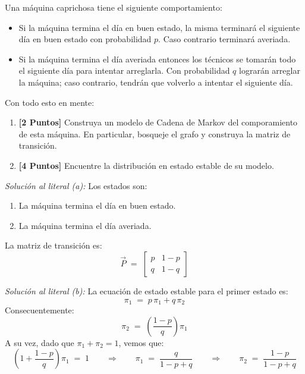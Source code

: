 \documentclass[ a4paper, twoside, 11pt]{article}
\begin{document}
\begin{problem}
Una m\'aquina caprichosa tiene el siguiente comportamiento: 
\begin{itemize}
\item Si la m\'aquina termina el d\'ia en buen estado, la misma terminar\'a el siguiente d\'ia en buen estado con probabilidad $p$. Caso contrario terminar\'a averiada. 
\item Si la m\'aquina termina el d\'ia averiada entonces los t\'ecnicos se tomar\'an todo el siguiente d\'ia para intentar arreglarla. Con probabilidad $q$ lograr\'an arreglar la m\'aquina; caso contrario, tendr\'an que volverlo a intentar el siguiente d\'ia. 
\end{itemize}

Con todo esto en mente: 
\begin{enumerate}[label=\alph*.]
\item \textbf{[2 Puntos]} Construya un modelo de Cadena de Markov del comporamiento de esta m\'aquina. En particular, bosqueje el grafo y construya la matriz de transici\'on. 
\item \textbf{[4 Puntos]} Encuentre la distribuci\'on en estado estable de su modelo. 
\end{enumerate}

\emph{Soluci\'on al literal (a):} Los estados son: 
\begin{enumerate}
\item La m\'aquina termina el d\'ia en buen estado. 
\item La m\'aquina termina el d\'ia averiada. 
\end{enumerate}
La matriz de transici\'on es: 
\[
\vec{P} \; = \;
\left[
\begin{array}{cc}
p & 1-p \\ q & 1-q
\end{array}
\right]
\]

\emph{Soluci\'on al literal (b):} La ecuaci\'on de estado estable para el primer estado es: 
\[
\pi_1 \; = \; p \, \pi_1 + q \, \pi_2
\]
Consecuentemente: 
\[
\pi_2 \; = \; \left( \frac{1-p}{q} \right) \pi_1
\]
A su vez, dado que $\pi_1 + \pi_2 = 1$, vemos que: 
\[
\left( 1 + \frac{1-p}{q} \right) \pi_1 \; = \; 1
\qquad \Longrightarrow \qquad
\pi_1 \; = \; \frac{q}{1-p+q}
\qquad \Longrightarrow \qquad
\pi_2 \; = \; \frac{1-p}{1-p+q}
\]

\end{problem}
\vspace{\baselineskip}
\end{document}
